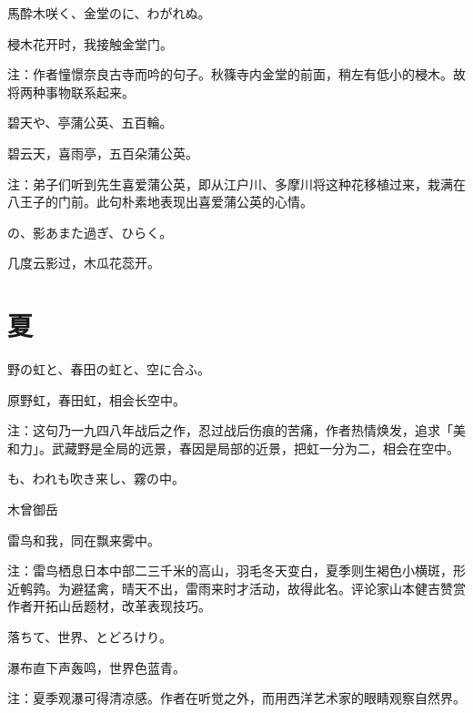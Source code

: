\begin{haiku}
    {\FH 馬酔木咲く、金堂のに、わがれぬ。}

    {\FK 梫木花开时，我接触金堂门。}

    {\FT 注：作者憧憬奈良古寺而吟的句子。秋篠寺内金堂的前面，稍左有低小的梫木。故将两种事物联系起来。}
\end{haiku}

\begin{haiku}
    {\FH 碧天や、亭蒲公英、五百輪。}

    {\FK 碧云天，喜雨亭，五百朵蒲公英。}

    {\FT 注：弟子们听到先生喜爱蒲公英，即从江户川、多摩川将这种花移植过来，栽满在八王子的门前。此句朴素地表现出喜爱蒲公英的心情。}
\end{haiku}

\begin{haiku}
    {\FH {}の、影あまた過ぎ、ひらく。}

    {\FK 几度云影过，木瓜花蕊开。}
\end{haiku}

\section{\FK 夏}

\setcounter{haikucounter}{0}

\begin{haiku}
    {\FH 野の虹と、春田の虹と、空に合ふ。}

    {\FK 原野虹，春田虹，相会长空中。}

    {\FT 注：这句乃一九四八年战后之作，忍过战后伤痕的苦痛，作者热情焕发，追求「美和力」。武藏野是全局的远景，春因是局部的近景，把虹一分为二，相会在空中。}
\end{haiku}

\begin{haiku}
    {\FH {}も、われも吹き来し、霧の中。}

    {\FK 木曾御岳}

    {\FK 雷鸟和我，同在飘来雾中。}

    {\FT 注：雷鸟栖息日本中部二三千米的高山，羽毛冬天变白，夏季则生褐色小横斑，形近鹌鹑。为避猛禽，晴天不出，雷雨来时才活动，故得此名。评论家山本健吉赞赏作者开拓山岳题材，改革表现技巧。}
\end{haiku}

\begin{haiku}
    {\FH {}落ちて、世界、とどろけり。}

    {\FK 瀑布直下声轰鸣，世界色蓝青。}

    {\FT 注：夏季观瀑可得清凉感。作者在听觉之外，而用西洋艺术家的眼睛观察自然界。}
\end{haiku}

